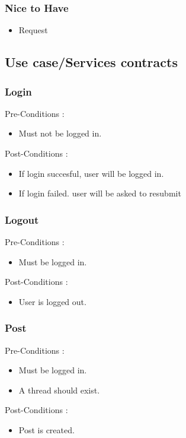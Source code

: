 \documentclass[12pt, oneside]{article}
\begin{document}
		\subsubsection{Nice to Have}
			\begin{itemize}
				\item Request
			 \end{itemize}
	\subsection{Use case/Services contracts}
			\subsubsection{Login}
				Pre-Conditions : \begin{itemize}
							\item Must not be logged in.
						     \end{itemize}
				Post-Conditions : \begin{itemize}
							\item If login succesful, user will be logged in.
							\item If login failed. user will be asked to resubmit
						     \end{itemize}
			\subsubsection{Logout}
				Pre-Conditions : \begin{itemize}
							\item Must be logged in.
						     \end{itemize}
				Post-Conditions : \begin{itemize}
							\item User is logged out.
						     \end{itemize}
			\subsubsection{Post}
				Pre-Conditions : \begin{itemize}
							\item Must be logged in.
							\item A thread should exist.
						     \end{itemize}
				Post-Conditions : \begin{itemize}
							\item Post is created.
						     \end{itemize}
\end{document}
